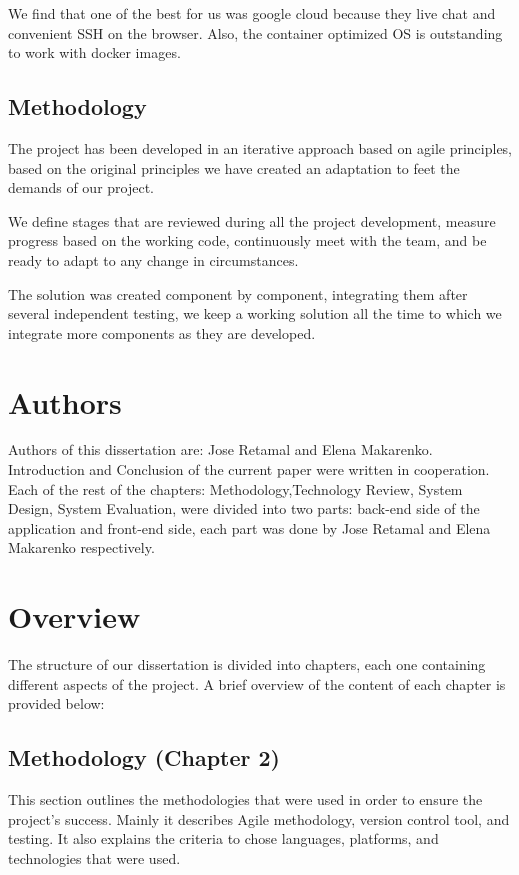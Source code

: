 We find that one of the best for us was google cloud because they live chat and convenient SSH on the browser.  Also, the container optimized OS is outstanding to work with docker images. 


\subsection{Methodology}
\vskip 0.1in
\indent
\indent
The project has been developed in an iterative approach based on agile principles, based on the original principles we have created an adaptation to feet the demands of our project.

We define stages that are reviewed during all the project development, measure progress based on the working code, continuously meet with the team, and be ready to adapt to any change in circumstances.

The solution was created component by component, integrating them after several independent testing, we keep a working solution all the time to which we integrate more components as they are developed.


\section{Authors}
\vskip 0.1in
\indent
\indent
Authors of this dissertation are: Jose Retamal and Elena Makarenko. Introduction and Conclusion of the current paper were written in cooperation. 
Each of the rest of the chapters: Methodology,Technology Review, System Design, System Evaluation, were divided into two parts: back-end side of the application and front-end side, each part was done by Jose Retamal and Elena Makarenko respectively.

\section{Overview}
\vskip 0.1in
\indent
\indent

The structure of our dissertation is divided into chapters, each one containing different aspects of the project. A brief overview of the content of each chapter is provided below:

\subsection{Methodology (Chapter 2)}
This section outlines the methodologies that were used in order to ensure the project's success.
Mainly it describes Agile methodology, version control tool, and testing.
It also explains the criteria to chose languages, platforms, and technologies that were used.


